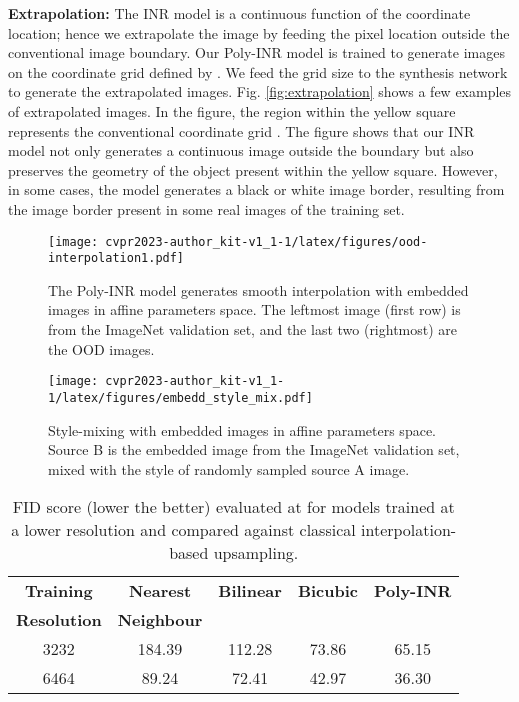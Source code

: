 \noindent\textbf{Extrapolation:}
The INR model is a continuous function of the coordinate location; hence we extrapolate the image by feeding the pixel location outside the conventional image boundary. Our Poly-INR model is trained to generate images on the coordinate grid defined by . We feed the grid size  to the synthesis network to generate the extrapolated images. Fig. \ref{fig:extrapolation} shows a few examples of extrapolated images. In the figure, the region within the yellow square represents the conventional coordinate grid . The figure shows that our INR model not only generates a continuous image outside the boundary but also preserves the geometry of the object present within the yellow square. However, in some cases, the model generates a black or white image border, resulting from the image border present in some real images of the training set. 


\begin{figure*}[t!]
     \centering
\texttt{[image: cvpr2023-author\_kit-v1\_1-1/latex/figures/ood-interpolation1.pdf]}
        \vspace{-0.1in}
        \caption{The Poly-INR model generates smooth interpolation with embedded images in affine parameters space. The leftmost image (first row) is from the ImageNet validation set, and the last two (rightmost) are the OOD images.}
        \label{fig:oodinter}
        \vspace{-0.2in}
\end{figure*}
\begin{figure}[ht!]
     \centering
\texttt{[image: cvpr2023-author\_kit-v1\_1-1/latex/figures/embedd\_style\_mix.pdf]}
\caption{Style-mixing with embedded images in affine parameters space. Source B is the embedded image from the ImageNet validation
set, mixed with the style of randomly sampled source A image.}
        \label{fig:oodstylemix}
\end{figure}
\begin{table}[ht!]
\caption{FID score (lower the better) evaluated at  for models trained at a lower resolution and compared against classical interpolation-based upsampling.}
\label{table:highres_sampling}
\centering
\begin{small}
\begin{tabular}{ccccc}
\toprule
\multicolumn{1}{c}{\textbf{Training}} & \multicolumn{1}{c}{\textbf{Nearest}}& 
\multicolumn{1}{c}{\textbf{Bilinear}}&
\multicolumn{1}{c}{\textbf{Bicubic}}&
\multicolumn{1}{c}{\textbf{Poly-INR}}
\\
\textbf{Resolution} & \textbf{Neighbour}& & &\\
\midrule
3232 & 184.39& 112.28& 73.86 &65.15\\
6464 & 89.24& 72.41 & 42.97 &36.30\\
\bottomrule
\end{tabular}
\end{small}
\end{table}


